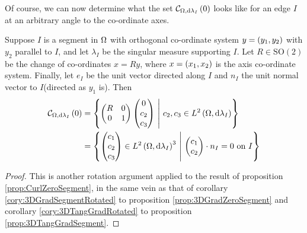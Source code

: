 Of course, we can now determine what the set $\mathcal{C}_{ \Omega, \mathrm{d}\lambda_I}\left( 0 \right)$ looks like for an edge $I$ at an arbitrary angle to the co-ordinate axes.
\begin{cory} \label{cory:CurlZeroRotated}
	Suppose $I$ is a segment in $\Omega$ with orthogonal co-ordinate system $y = \left( y_1, y_2 \right)$ with $y_2$ parallel to $I$, and let $\lambda_I$ be the singular measure supporting $I$. 
	Let $R\in\mathrm{SO}(2)$ be the change of co-ordinates $x = Ry$, where $x = \left( x_1, x_2 \right)$ is the axis co-ordinate system. 
	Finally, let $e_I$ be the unit vector directed along $I$ and $n_I$ the unit normal vector to $I$(directed as $y_1$ is). 
	Then
	\begin{align*}
		\mathcal{C}_{ \Omega, \mathrm{d}\lambda_I}\left( 0 \right) &= 
		\left\{  \begin{pmatrix} R & 0 \\ 0 & 1 \end{pmatrix} \begin{pmatrix} 0 \\ c_2 \\ c_3 \end{pmatrix} \ \middle\vert \  c_2,c_3\in L^{2}\left( \Omega,\mathrm{d}\lambda_I \right)  \right\} \\
		&= \left\{  \begin{pmatrix} c_1 \\ c_2 \\ c_3 \end{pmatrix}\in L^{2}\left( \Omega,\mathrm{d}\lambda_I \right)^3 \ \middle\vert \  \begin{pmatrix} c_1 \\ c_2 \end{pmatrix} \cdot n_I = 0 \text{ on } I  \right\}
	\end{align*}
\end{cory}
\begin{proof}
	This is another rotation argument applied to the result of proposition \ref{prop:CurlZeroSegment}, in the same vein as that of corollary \ref{cory:3DGradSegmentRotated} to proposition \ref{prop:3DGradZeroSegment} and corollary \ref{cory:3DTangGradRotated} to proposition \ref{prop:3DTangGradSegment}.
\end{proof}

